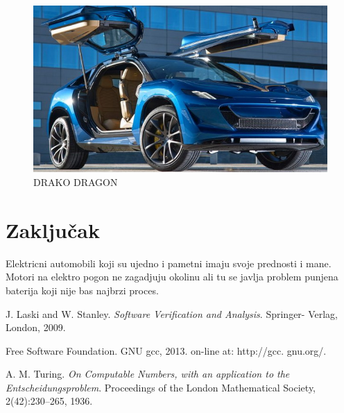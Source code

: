\documentclass[a4paper]{article}
\begin{document}
\begin{figure}[h]
        \centering
        \includegraphics[width=\linewidth]{DRAKO.jpg}
        \caption{DRAKO DRAGON}
        \label{fig:img_DRAKO}
        \end{figure}


\newpage

\section{Zaključak}
\label{sec:zakljucak}

Elektricni automobili koji su ujedno i pametni imaju svoje prednosti i mane. Motori na elektro pogon ne zagadjuju okolinu ali tu se javlja problem punjena baterija koji nije bas najbrzi proces.


\appendix

\begin{thebibliography}{9}

 J. Laski and W. Stanley. \emph{Software Verification and Analysis}. Springer- Verlag, London, 2009.

 Free Software Foundation. GNU gcc, 2013. on-line at: http://gcc. gnu.org/.

 A. M. Turing. \emph{On Computable Numbers, with an application to the Entscheidungsproblem}. Proceedings of the London Mathematical Society, 2(42):230–265, 1936.


\end{thebibliography}
\end{document}

